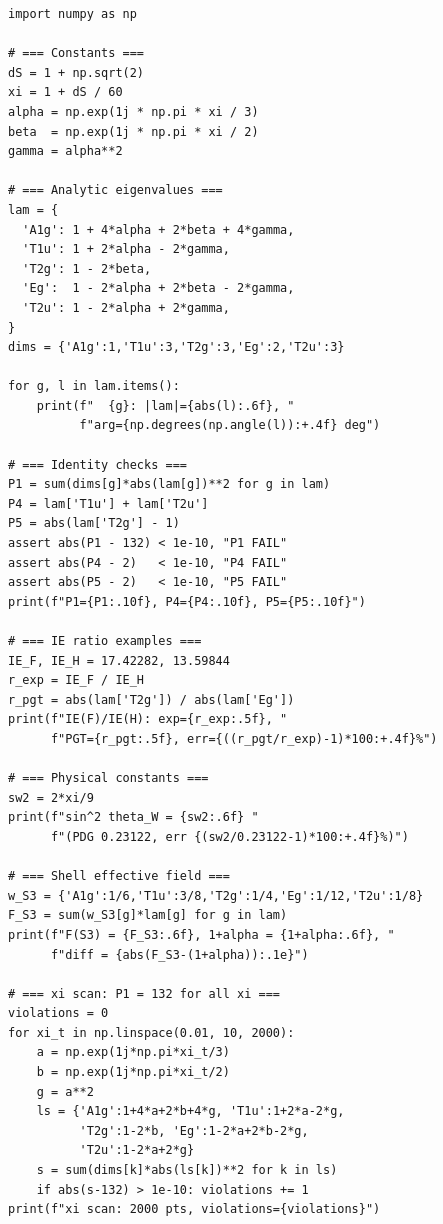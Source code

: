 \documentclass[11pt,a4paper]{article}
\begin{document}
\begin{lstlisting}
import numpy as np

# === Constants ===
dS = 1 + np.sqrt(2)
xi = 1 + dS / 60
alpha = np.exp(1j * np.pi * xi / 3)
beta  = np.exp(1j * np.pi * xi / 2)
gamma = alpha**2

# === Analytic eigenvalues ===
lam = {
  'A1g': 1 + 4*alpha + 2*beta + 4*gamma,
  'T1u': 1 + 2*alpha - 2*gamma,
  'T2g': 1 - 2*beta,
  'Eg':  1 - 2*alpha + 2*beta - 2*gamma,
  'T2u': 1 - 2*alpha + 2*gamma,
}
dims = {'A1g':1,'T1u':3,'T2g':3,'Eg':2,'T2u':3}

for g, l in lam.items():
    print(f"  {g}: |lam|={abs(l):.6f}, "
          f"arg={np.degrees(np.angle(l)):+.4f} deg")

# === Identity checks ===
P1 = sum(dims[g]*abs(lam[g])**2 for g in lam)
P4 = lam['T1u'] + lam['T2u']
P5 = abs(lam['T2g'] - 1)
assert abs(P1 - 132) < 1e-10, "P1 FAIL"
assert abs(P4 - 2)   < 1e-10, "P4 FAIL"
assert abs(P5 - 2)   < 1e-10, "P5 FAIL"
print(f"P1={P1:.10f}, P4={P4:.10f}, P5={P5:.10f}")

# === IE ratio examples ===
IE_F, IE_H = 17.42282, 13.59844
r_exp = IE_F / IE_H
r_pgt = abs(lam['T2g']) / abs(lam['Eg'])
print(f"IE(F)/IE(H): exp={r_exp:.5f}, "
      f"PGT={r_pgt:.5f}, err={((r_pgt/r_exp)-1)*100:+.4f}%")

# === Physical constants ===
sw2 = 2*xi/9
print(f"sin^2 theta_W = {sw2:.6f} "
      f"(PDG 0.23122, err {(sw2/0.23122-1)*100:+.4f}%)")

# === Shell effective field ===
w_S3 = {'A1g':1/6,'T1u':3/8,'T2g':1/4,'Eg':1/12,'T2u':1/8}
F_S3 = sum(w_S3[g]*lam[g] for g in lam)
print(f"F(S3) = {F_S3:.6f}, 1+alpha = {1+alpha:.6f}, "
      f"diff = {abs(F_S3-(1+alpha)):.1e}")

# === xi scan: P1 = 132 for all xi ===
violations = 0
for xi_t in np.linspace(0.01, 10, 2000):
    a = np.exp(1j*np.pi*xi_t/3)
    b = np.exp(1j*np.pi*xi_t/2)
    g = a**2
    ls = {'A1g':1+4*a+2*b+4*g, 'T1u':1+2*a-2*g,
          'T2g':1-2*b, 'Eg':1-2*a+2*b-2*g,
          'T2u':1-2*a+2*g}
    s = sum(dims[k]*abs(ls[k])**2 for k in ls)
    if abs(s-132) > 1e-10: violations += 1
print(f"xi scan: 2000 pts, violations={violations}")
\end{lstlisting}
\end{document}
